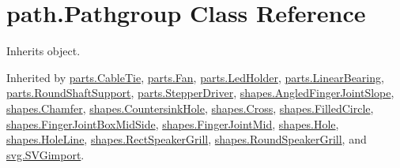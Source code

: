 \hypertarget{classpath_1_1_pathgroup}{}\section{path.\+Pathgroup Class Reference}
\label{classpath_1_1_pathgroup}


Inherits object.



Inherited by \hyperlink{classparts_1_1_cable_tie}{parts.\+Cable\+Tie}, \hyperlink{classparts_1_1_fan}{parts.\+Fan}, \hyperlink{classparts_1_1_led_holder}{parts.\+Led\+Holder}, \hyperlink{classparts_1_1_linear_bearing}{parts.\+Linear\+Bearing}, \hyperlink{classparts_1_1_round_shaft_support}{parts.\+Round\+Shaft\+Support}, \hyperlink{classparts_1_1_stepper_driver}{parts.\+Stepper\+Driver}, \hyperlink{classshapes_1_1_angled_finger_joint_slope}{shapes.\+Angled\+Finger\+Joint\+Slope}, \hyperlink{classshapes_1_1_chamfer}{shapes.\+Chamfer}, \hyperlink{classshapes_1_1_countersink_hole}{shapes.\+Countersink\+Hole}, \hyperlink{classshapes_1_1_cross}{shapes.\+Cross}, \hyperlink{classshapes_1_1_filled_circle}{shapes.\+Filled\+Circle}, \hyperlink{classshapes_1_1_finger_joint_box_mid_side}{shapes.\+Finger\+Joint\+Box\+Mid\+Side}, \hyperlink{classshapes_1_1_finger_joint_mid}{shapes.\+Finger\+Joint\+Mid}, \hyperlink{classshapes_1_1_hole}{shapes.\+Hole}, \hyperlink{classshapes_1_1_hole_line}{shapes.\+Hole\+Line}, \hyperlink{classshapes_1_1_rect_speaker_grill}{shapes.\+Rect\+Speaker\+Grill}, \hyperlink{classshapes_1_1_round_speaker_grill}{shapes.\+Round\+Speaker\+Grill}, and \hyperlink{classsvg_1_1_s_v_gimport}{svg.\+S\+V\+Gimport}.

